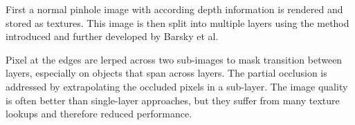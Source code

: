 First a normal pinhole image with according depth information is rendered and stored as textures.
This image is then split into multiple layers using the method introduced and further developed by Barsky et al.\cite{Barsky.2002, BrianA.Barsky.2005}

Pixel at the edges are lerped across two sub-images to mask transition between layers, especially on objects that span across layers.
The partial occlusion is addressed by extrapolating the occluded pixels in a sub-layer.
The image quality is often better than single-layer approaches, but they suffer from many texture lookups and therefore reduced performance.

\cite{Kraus.2007}

